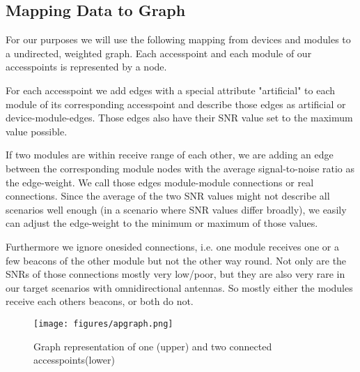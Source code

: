   \subsection{Mapping Data to Graph}
    For our purposes we will use the following mapping from devices and modules to a undirected, weighted graph.
    Each accesspoint and each module of our accesspoints is represented by a node.
    
    For each accesspoint we add edges with a special attribute "artificial" 
    to each module of its corresponding accesspoint and describe those edges as artificial or device-module-edges.
    Those edges also have their SNR value set to the maximum value possible. 
    
    If two modules are within receive range of each other, 
    we are adding an edge between the corresponding module nodes with the average signal-to-noise ratio as the edge-weight.
    We call those edges module-module connections or real connections.
    Since the average of the two SNR values might not describe all scenarios well enough (in a scenario where SNR values differ broadly),
    we easily can adjust the edge-weight to the minimum or maximum of those values.
    
    Furthermore we ignore onesided connections, i.e. one module receives one or a few beacons of the other module but not the other way round.
    Not only are the SNRs of those connections mostly very low/poor, but they are also very rare in our target scenarios with omnidirectional antennas.
    So mostly either the modules receive each others beacons, or both do not.
    \begin{figure}[th!]
      \centering
      \texttt{[image: figures/apgraph.png]}
      \caption{Graph representation of one (upper) and two connected accesspoints(lower)}
      \label{fig:apgraph}
    \end{figure}
    
